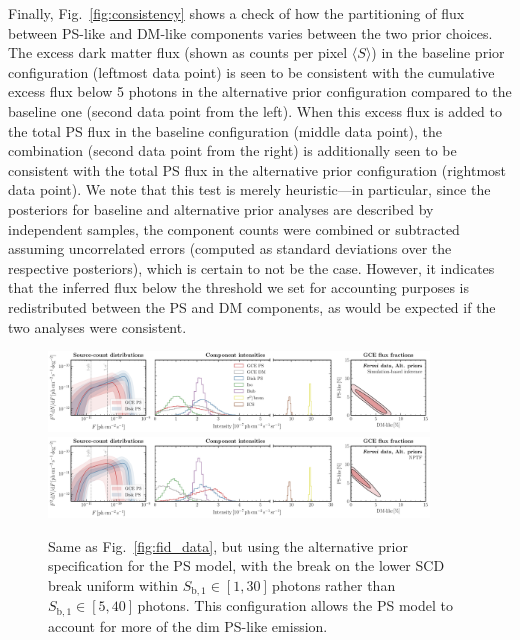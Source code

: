 \documentclass[prd,aps,10pt,nofootinbib,twocolumn,superscriptaddress,preprintnumbers,balancelastpage,longbibliography,floatfix]{revtex4-2}
\begin{document}
Finally, Fig.~\ref{fig:consistency} shows a check of how the partitioning of flux between PS-like and DM-like components varies between the two prior choices. 
The excess dark matter flux (shown as counts per pixel $\langle S \rangle$) in the baseline prior configuration (leftmost data point) is seen to be consistent with the cumulative excess flux below 5 photons in the alternative prior configuration compared to the baseline one (second data point from the left). When this excess flux is added to the total PS flux in the baseline configuration (middle data point), the combination (second data point from the right) is additionally seen to be consistent with the total PS flux in the alternative prior configuration (rightmost data point). We note that this test is merely heuristic---in particular, since the posteriors for baseline and alternative prior analyses are described by independent samples, the component counts were combined or subtracted assuming uncorrelated errors (computed as standard deviations over the respective posteriors), which is certain to not be the case. However, it indicates that the inferred flux below the threshold we set for accounting purposes is redistributed between the PS and DM components, as would be expected if the two analyses were consistent.

%
\begin{figure}[!htbp]
\centering
\includegraphics[width=0.9\textwidth]{plots/data_fid_sbi_new_ps_priors.pdf}
\includegraphics[width=0.9\textwidth]{plots/data_fid_nptf_new_ps_priors.pdf}
\caption{Same as Fig.~\ref{fig:fid_data}, but using the alternative prior specification for the PS model, with the break on the lower SCD break uniform within $S_{\mathrm{b}, 1}  \in  [1, 30]$\,photons rather than $S_{\mathrm{b}, 1}  \in  [5, 40]$\,photons. This configuration allows the PS model to account for more of the dim PS-like emission.}
\label{fig:fid_data_alt_priors}
\end{figure}
%
\end{document}
